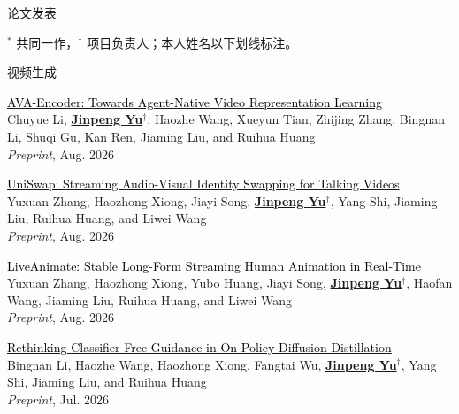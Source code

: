 \documentclass{resume} %
\newcommand{\publink}[2]{\href{#1}{\textcolor{black}{#2}}}
\begin{document}
\vspace{-8pt}

\begin{rSection}{论文发表}
{\small $^*$ 共同一作，$^\dagger$ 项目负责人；本人姓名以下划线标注。\par}

\begin{rSubsection}{\hspace*{-1.5em}视频生成}{}{}{}
\item \publink{https://ava-encoder.github.io/}{AVA-Encoder: Towards Agent-Native Video Representation Learning} \\
Chuyue Li, \underline{\bf Jinpeng Yu$^\dagger$}, Haozhe Wang, Xueyun Tian, Zhijing Zhang, Bingnan Li, Shuqi Gu, Kan Ren, Jiaming Liu, and Ruihua Huang \\
{\em Preprint}, Aug. 2026
\item \publink{https://uniswap-av.github.io/}{UniSwap: Streaming Audio-Visual Identity Swapping for Talking Videos} \\
Yuxuan Zhang, Haozhong Xiong, Jiayi Song, \underline{\bf Jinpeng Yu$^\dagger$}, Yang Shi, Jiaming Liu, Ruihua Huang, and Liwei Wang \\
{\em Preprint}, Aug. 2026
\item \publink{https://liveanimate.github.io/}{LiveAnimate: Stable Long-Form Streaming Human Animation in Real-Time} \\
Yuxuan Zhang, Haozhong Xiong, Yubo Huang, Jiayi Song, \underline{\bf Jinpeng Yu$^\dagger$}, Haofan Wang, Jiaming Liu, Ruihua Huang, and Liwei Wang \\
{\em Preprint}, Aug. 2026
\item \publink{https://rethinking-cfg-opd.github.io/}{Rethinking Classifier-Free Guidance in On-Policy Diffusion Distillation} \\
Bingnan Li, Haozhe Wang, Haozhong Xiong, Fangtai Wu, \underline{\bf Jinpeng Yu$^\dagger$}, Yang Shi, Jiaming Liu, and Ruihua Huang \\
{\em Preprint}, Jul. 2026
\end{rSubsection}


\end{rSection}
\end{document}
